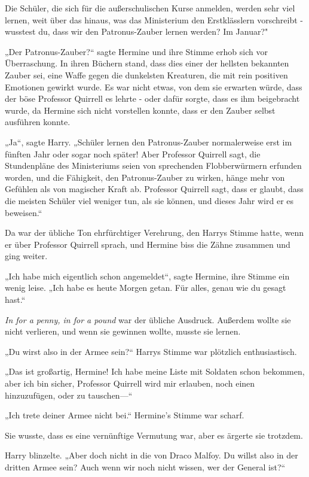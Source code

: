 {Die Schüler, die sich für die außerschulischen Kurse anmelden, werden sehr viel lernen, weit über das hinaus, was das Ministerium den Erstklässlern vorschreibt - wusstest du, dass wir den Patronus-Zauber lernen werden? Im Januar?"

„Der Patronus-Zauber?“ sagte Hermine und ihre Stimme erhob sich vor Überraschung. In ihren Büchern stand, dass dies einer der hellsten bekannten Zauber sei, eine Waffe gegen die dunkelsten Kreaturen, die mit rein positiven Emotionen gewirkt wurde. Es war nicht etwas, von dem sie erwarten würde, dass der böse Professor Quirrell es lehrte - oder dafür sorgte, dass es ihm beigebracht wurde, da Hermine sich nicht vorstellen konnte, dass er den Zauber selbst ausführen konnte.

„Ja“, sagte Harry. „Schüler lernen den Patronus-Zauber normalerweise erst im fünften Jahr oder sogar noch später! Aber Professor Quirrell sagt, die Stundenpläne des Ministeriums seien von sprechenden Flobberwürmern erfunden worden, und die Fähigkeit, den Patronus-Zauber zu wirken, hänge mehr von Gefühlen als von magischer Kraft ab. Professor Quirrell sagt, dass er glaubt, dass die meisten Schüler viel weniger tun, als sie können, und dieses Jahr wird er es beweisen.“

Da war der übliche Ton ehrfürchtiger Verehrung, den Harrys Stimme hatte, wenn er über Professor Quirrell sprach, und Hermine biss die Zähne zusammen und ging weiter.

„Ich habe mich eigentlich schon angemeldet“, sagte Hermine, ihre Stimme ein wenig leise. „Ich habe es heute Morgen getan. Für alles, genau wie du gesagt hast.“

\emph{In for a penny, in for a pound} war der übliche Ausdruck. Außerdem wollte sie nicht verlieren, und wenn sie gewinnen wollte, musste sie lernen.

„Du wirst also in der Armee sein?“ Harrys Stimme war plötzlich enthusiastisch.

„Das ist großartig, Hermine! Ich habe meine Liste mit Soldaten schon bekommen, aber ich bin sicher, Professor Quirrell wird mir erlauben, noch einen hinzuzufügen, oder zu tauschen—“

„Ich trete deiner Armee nicht bei.“ Hermine's Stimme war scharf.

Sie wusste, dass es eine vernünftige Vermutung war, aber es ärgerte sie trotzdem.

Harry blinzelte. „Aber doch nicht in die von Draco Malfoy. Du willst also in der dritten Armee sein? Auch wenn wir noch nicht wissen, wer der General ist?“

}
